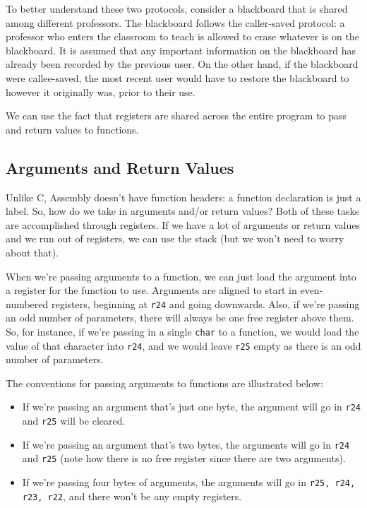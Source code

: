 To better understand these two protocols, consider a blackboard that is shared among different professors. The blackboard follows the caller-saved protocol: a professor who enters the classroom to teach is allowed to erase whatever is on the blackboard. It is assumed that any important information on the blackboard has already been recorded by the previous user. On the other hand, if the blackboard were callee-saved, the most recent user would have to restore the blackboard to however it originally was, prior to their use.  


We can use the fact that registers are shared across the entire program to pass and return values to functions.

\subsection{Arguments and Return Values}

Unlike C, Assembly doesn't have function headers: a function declaration is just a label. So, how do we take in arguments and/or return values? Both of these tasks are accomplished through registers. If we have a lot of arguments or return values and we run out of registers, we can use the stack (but we won't need to worry about that). 



When we're passing arguments to a function, we can just load the argument into a register for the function to use. Arguments are aligned to start in even-numbered registers, beginning at \verb!r24! and going downwards. Also, if we're passing an odd number of parameters, there will always be one free register above them. So, for instance, if we're passing in a single \verb!char! to a function, we would load the value of that character into \verb!r24!, and we would leave \verb!r25! empty as there is an odd number of parameters.

The conventions for passing arguments to functions are illustrated below:
\begin{itemize}
    \item If we're passing an argument that's just one byte, the argument will go in \verb!r24! and \verb!r25! will be cleared.
    \item If we're passing an argument that's two bytes, the arguments will go in \verb!r24! and \verb!r25! (note how there is no free register since there are two arguments). 
    \item If we're passing four bytes of arguments, the arguments will go in \verb!r25, r24, r23, r22!, and there won't be any empty registers.  
\end{itemize} 

